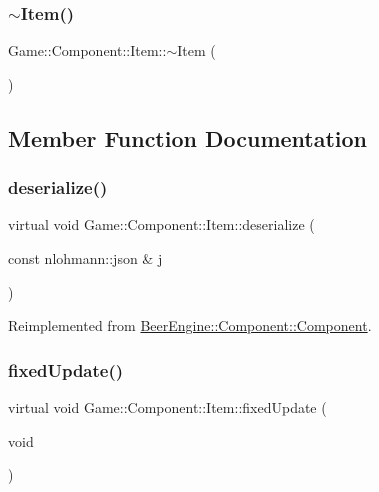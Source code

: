 \subsubsection{\texorpdfstring{$\sim$\+Item()}{~Item()}}
{\footnotesize\ttfamily Game\+::\+Component\+::\+Item\+::$\sim$\+Item (\begin{DoxyParamCaption}{ }\end{DoxyParamCaption})}



\subsection{Member Function Documentation}
\mbox{\label{class_game_1_1_component_1_1_item_a3a9cb5ba936a644f23976d9c9e9bbdce}} 
\subsubsection{\texorpdfstring{deserialize()}{deserialize()}}
{\footnotesize\ttfamily virtual void Game\+::\+Component\+::\+Item\+::deserialize (\begin{DoxyParamCaption}\item[{const nlohmann\+::json \&}]{j }\end{DoxyParamCaption})\hspace{0.3cm}{\ttfamily [virtual]}}



Reimplemented from \mbox{\hyperlink{class_beer_engine_1_1_component_1_1_component_a044d30f65879a1467f44aa3eb8ad7bce}{Beer\+Engine\+::\+Component\+::\+Component}}.

\mbox{\label{class_game_1_1_component_1_1_item_a3402bfd1509d12eb16fadbc37222406d}} 
\subsubsection{\texorpdfstring{fixed\+Update()}{fixedUpdate()}}
{\footnotesize\ttfamily virtual void Game\+::\+Component\+::\+Item\+::fixed\+Update (\begin{DoxyParamCaption}\item[{void}]{ }\end{DoxyParamCaption})\hspace{0.3cm}{\ttfamily [virtual]}}




